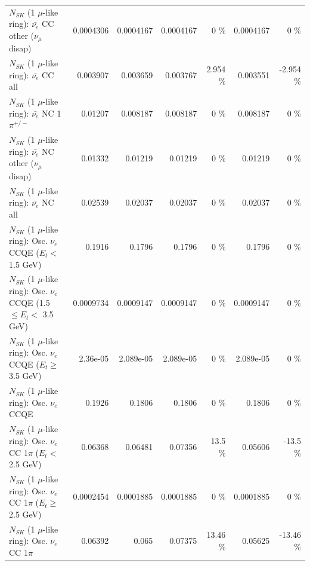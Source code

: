 \begin{table}
\begin{tabular}{| l | r | r | r  r | r  r |}
          $N_{SK}$ (1 $\mu$-like ring): $\bar{\nu_e}$ CC other ($\nu_\mu$ disap) &       0.0004306 &       0.0004167 &       0.0004167 &        0 \%  &       0.0004167 &        0 \%  \\ 
                            $N_{SK}$ (1 $\mu$-like ring): $\bar{\nu_{e}}$ CC all &        0.003907 &        0.003659 &        0.003767 &    2.954 \%  &        0.003551 &   -2.954 \%  \\ 
\hline
                     $N_{SK}$ (1 $\mu$-like ring): $\bar{\nu_e}$ NC 1$\pi^{+/-}$ &         0.01207 &        0.008187 &        0.008187 &        0 \%  &        0.008187 &        0 \%  \\ 
          $N_{SK}$ (1 $\mu$-like ring): $\bar{\nu_e}$ NC other ($\nu_\mu$ disap) &         0.01332 &         0.01219 &         0.01219 &        0 \%  &         0.01219 &        0 \%  \\ 
                            $N_{SK}$ (1 $\mu$-like ring): $\bar{\nu_{e}}$ NC all &         0.02539 &         0.02037 &         0.02037 &        0 \%  &         0.02037 &        0 \%  \\ 
\hline
\hline
\hline
             $N_{SK}$ (1 $\mu$-like ring): Osc. $\nu_e$ CCQE ($E_{t} <$ 1.5 GeV) &          0.1916 &          0.1796 &          0.1796 &        0 \%  &          0.1796 &        0 \%  \\ 
    $N_{SK}$ (1 $\mu$-like ring): Osc. $\nu_e$ CCQE (1.5 $\leq E_{t} <$ 3.5 GeV) &       0.0009734 &       0.0009147 &       0.0009147 &        0 \%  &       0.0009147 &        0 \%  \\ 
          $N_{SK}$ (1 $\mu$-like ring): Osc. $\nu_e$ CCQE ($E_{t} \geq$ 3.5 GeV) &        2.36e-05 &       2.089e-05 &       2.089e-05 &        0 \%  &       2.089e-05 &        0 \%  \\ 
\hline
                                 $N_{SK}$ (1 $\mu$-like ring): Osc. $\nu_e$ CCQE &          0.1926 &          0.1806 &          0.1806 &        0 \%  &          0.1806 &        0 \%  \\ 
\hline
        $N_{SK}$ (1 $\mu$-like ring): Osc. $\nu_e$ CC 1$\pi$ ($E_{t} <$ 2.5 GeV) &         0.06368 &         0.06481 &         0.07356 &     13.5 \%  &         0.05606 &    -13.5 \%  \\ 
     $N_{SK}$ (1 $\mu$-like ring): Osc. $\nu_e$ CC 1$\pi$ ($E_{t} \geq$ 2.5 GeV) &       0.0002454 &       0.0001885 &       0.0001885 &        0 \%  &       0.0001885 &        0 \%  \\ 
\hline
                            $N_{SK}$ (1 $\mu$-like ring): Osc. $\nu_e$ CC 1$\pi$ &         0.06392 &           0.065 &         0.07375 &    13.46 \%  &         0.05625 &   -13.46 \%  \\ 

\end{tabular}
\end{table}
